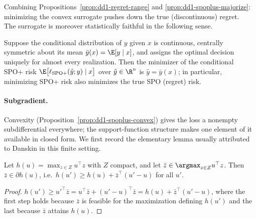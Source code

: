 Combining Propositions~\ref{prop:dd1-regret-range} and
\ref{prop:dd1-spoplus-majorize}: minimizing the convex surrogate pushes down
the true (discontinuous) regret. The surrogate is moreover statistically
faithful in the following sense.

\begin{theorem}
\label{thm:dd1-fisher}
Suppose the conditional distribution of $y$ given $x$ is continuous, centrally
symmetric about its mean $\bar{y}(x) = \E[y \mid x]$, and assigns the optimal
decision uniquely for almost every realization. Then the minimizer of the
conditional SPO+ risk $\E\bigl[\ell_{\mathrm{SPO+}}(\hat{y}; y) \mid x\bigr]$
over $\hat{y} \in \R^n$ is $\hat{y} = \bar{y}(x)$; in particular, minimizing
SPO+ risk also minimizes the true SPO (regret) risk.
\end{theorem}

\paragraph{Subgradient.} Convexity (Proposition~\ref{prop:dd1-spoplus-convex})
gives the loss a nonempty subdifferential everywhere; the support-function
structure makes one element of it available in closed form. We first record
the elementary lemma usually attributed to Danskin in this finite setting.

\begin{lemma}
\label{lem:dd1-danskin}
Let $h(u) = \max_{z \in Z} u^\top z$ with $Z$ compact, and let
$\bar{z} \in \argmax_{z \in Z} u^\top z$. Then $\bar{z} \in \partial h(u)$,
i.e.\ $h(u') \ge h(u) + \bar{z}^\top (u' - u)$ for all $u'$.
\end{lemma}

\begin{proof}
$h(u') \ge u'^\top \bar{z} = u^\top \bar{z} + (u' - u)^\top \bar{z}
= h(u) + \bar{z}^\top (u' - u)$, where the first step holds because $\bar{z}$
is feasible for the maximization defining $h(u')$ and the last because
$\bar{z}$ attains $h(u)$.
\end{proof}

